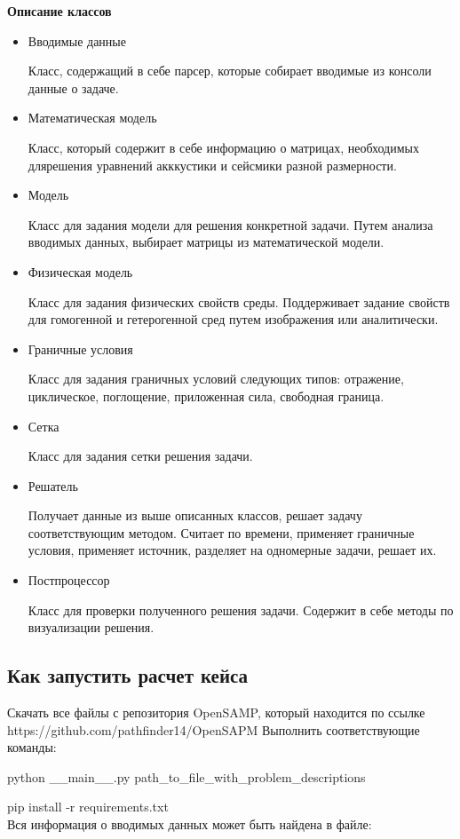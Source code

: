 \documentclass{article}
\begin{document}
\textbf{Описание классов}
\begin{itemize}
\item Вводимые данные

Класс, содержащий в себе парсер, которые собирает вводимые из консоли данные о задаче.
\item Математическая модель

Класс, который содержит в себе информацию о матрицах, необходимых длярешения уравнений акккустики и сейсмики разной размерности.
\item Модель

Класс для задания модели для решения конкретной задачи. Путем анализа вводимых данных, выбирает матрицы из математической модели.
\item Физическая модель

Класс для задания физических свойств среды. Поддерживает задание свойств для гомогенной и гетерогенной сред путем изображения или аналитически.

\item Граничные условия

Класс для задания граничных условий следующих типов: отражение, циклическое, поглощение, приложенная сила, свободная граница.
\item Сетка

Класс для задания сетки решения задачи.
\item Решатель

Получает данные из выше описанных классов, решает задачу соответствующим методом. Считает по времени, применяет граничные условия, применяет источник, разделяет на одномерные задачи, решает их.
\item Постпроцессор

Класс для проверки полученного решения задачи. Содержит в себе методы по визуализации решения.
\end{itemize}

\subsection{Как запустить расчет кейса}

Скачать все файлы с репозитория OpenSAMP, который находится по ссылке https://github.com/pathfinder14/OpenSAPM
Выполнить соответствующие команды:

 python \_\_main\_\_.py path\_to\_file\_with\_problem\_descriptions 

pip install -r requirements.txt
\\
Вся информация о вводимых данных может быть найдена в файле:
\end{document}
